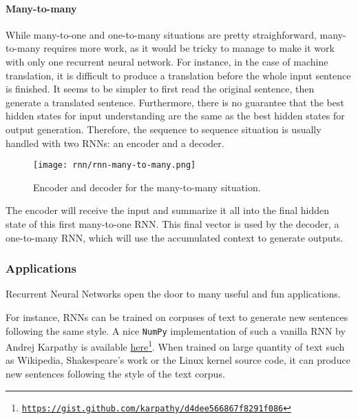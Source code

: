 \paragraph*{Many-to-many}
While many-to-one and one-to-many situations are pretty straighforward, many-to-many requires more work, as it would be tricky to manage to make it work with only one recurrent neural network. For instance, in the case of machine translation, it is difficult to produce a translation before the whole input sentence is finished. It seems to be simpler to first read the original sentence, then generate a translated sentence. Furthermore, there is no guarantee that the best hidden states for input understanding are the same as the best hidden states for output generation. Therefore, the sequence to sequence situation is usually handled with two RNNs: an encoder and a decoder.
\begin{figure}[H]
    \centering
    \texttt{[image: rnn/rnn-many-to-many.png]}
    \caption{Encoder and decoder for the many-to-many situation.}
\end{figure}
The encoder will receive the input and summarize it all into the final hidden state of this first many-to-one RNN. This final vector is used by the decoder, a one-to-many RNN, which will use the accumulated context to generate outputs.

\subsubsection{Applications}
Recurrent Neural Networks open the door to many useful and fun applications. 

For instance, RNNs can be trained on corpuses of text to generate new sentences following the same style. A nice \texttt{NumPy} implementation of such a vanilla RNN by Andrej Karpathy is available \href{https://gist.github.com/karpathy/d4dee566867f8291f086}{here}\footnote{\href{https://gist.github.com/karpathy/d4dee566867f8291f086}{\nolinkurl{https://gist.github.com/karpathy/d4dee566867f8291f086}}}. When trained on large quantity of text such as Wikipedia, Shakespeare's work or the Linux kernel source code, it can produce new sentences following the style of the text corpus.

